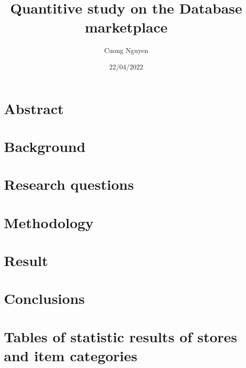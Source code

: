 \documentclass{article}
\title{Quantitive study on the Database marketplace}
\author{Cuong Nguyen}
\date{22/04/2022}
\begin{document}
    
\maketitle

\tableofcontents

\section{Abstract}\label{sec:abstract}

\section{Background}\label{sec:background}

\section{Research questions}\label{sec:research_questions}


\section{Methodology}\label{sec:method}


\section{Result}\label{sec:result}

\section{Conclusions}\label{sec:conclusion}

\printbibliography{}

\appendix
\section{Tables of statistic results of stores and item categories}

\end{document}
